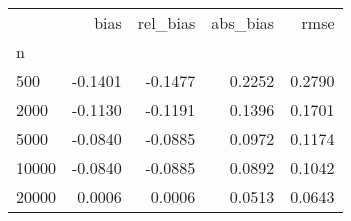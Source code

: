 \begin{tabular}{lrrrr}
\toprule
{} &    bias &  rel\_bias &  abs\_bias &   rmse \\
n     &         &           &           &        \\
\midrule
500   & -0.1401 &   -0.1477 &    0.2252 & 0.2790 \\
2000  & -0.1130 &   -0.1191 &    0.1396 & 0.1701 \\
5000  & -0.0840 &   -0.0885 &    0.0972 & 0.1174 \\
10000 & -0.0840 &   -0.0885 &    0.0892 & 0.1042 \\
20000 &  0.0006 &    0.0006 &    0.0513 & 0.0643 \\
\bottomrule
\end{tabular}
